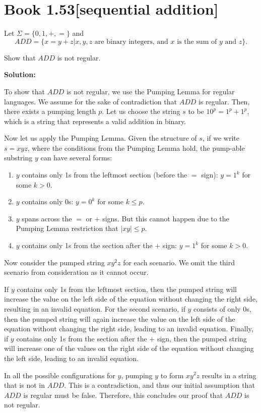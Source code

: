 \documentclass[11pt]{article}
\newenvironment{question}[2]
{\newpage\section{#1\texorpdfstring{\hfill}{horizontal spacing}{\rm\normalsize #2}}}{}
\newenvironment{solution}
{\textbf{Solution: }\color{blue}}
{\color{black}}
\begin{document}
\begin{question}{Book 1.53}{[sequential addition]}
Let \(\Sigma = \{0,1,+,=\}\) and
\[ADD = \{x=y+z | x,y,z \text{ are binary integers, and } x \text{ is the sum of } y \text{ and } z\}.\]

Show that \(ADD\) is not regular.

\begin{solution}

To show that \(ADD\) is not regular, we use the Pumping Lemma for regular languages. We assume for the sake of contradiction that \(ADD\) is regular. Then, there exists a pumping length \(p\). Let us choose the string \(s\) to be \(10^p = 1^p + 1^p\), which is a string that represents a valid addition in binary.

Now let us apply the Pumping Lemma. Given the structure of \(s\), if we write \(s=xyz\), where the conditions from the Pumping Lemma hold, the pump-able substring \(y\) can have several forms:
\begin{enumerate}
    \item \(y\) contains only 1s from the leftmost section (before the \(=\) sign): \(y=1^k\) for some \(k>0\).
    \item \(y\) contains only 0s: \(y=0^k\) for some \(k \leq p\).
    \item \(y\) spans across the \(=\) or \(+\) signs. But this cannot happen due to the Pumping Lemma restriction that \(|xy| \leq p\).
    \item \(y\) contains only 1s from the section after the \(+\) sign: \(y=1^k\) for some \(k>0\).
\end{enumerate}

Now consider the pumped string \(xy^2z\) for each scenario. We omit the third scenario from consideration as it cannot occur.

If \(y\) contains only 1s from the leftmost section, then the pumped string will increase the value on the left side of the equation without changing the right side, resulting in an invalid equation. For the second scenario, if \(y\) consists of only 0s, then the pumped string will again increase the value on the left side of the equation without changing the right side, leading to an invalid equation. Finally, if \(y\) contains only 1s from the section after the \(+\) sign, then the pumped string will increase one of the values on the right side of the equation without changing the left side, leading to an invalid equation.

In all the possible configurations for \(y\), pumping \(y\) to form \(xy^2z\) results in a string that is not in \(ADD\). This is a contradiction, and thus our initial assumption that \(ADD\) is regular must be false. Therefore, this concludes our proof that \(ADD\) is not regular.

\end{solution}
\end{question}
\end{document}
